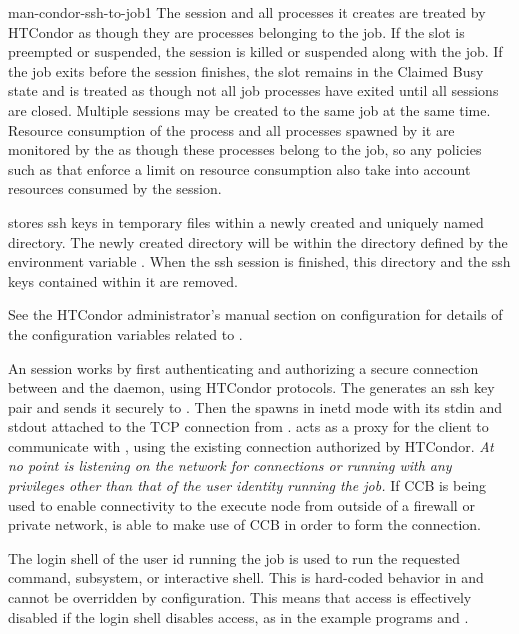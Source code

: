 \begin{ManPage}{}{man-condor-ssh-to-job}{1}
The  session and all processes it creates are treated by HTCondor as
though they are processes belonging to the job.
If the slot is preempted or suspended,
the  session is killed or suspended along with the job.
If the job exits before the  session finishes,
the slot remains in the Claimed Busy state and is treated as though not
all job processes have exited until all  sessions are closed.
Multiple  sessions may be created to the same job at the
same time.  Resource consumption of the  process and all processes
spawned by it are monitored by the  as though these
processes belong to the job, so any policies such as  that
enforce a limit on resource consumption also take into account resources
consumed by the  session.

 stores ssh keys in temporary files within a newly
created and uniquely named directory.
The newly created directory will be within the directory defined
by the environment variable . 
When the ssh session is finished, this directory and the ssh keys
contained within it are removed.

See the HTCondor administrator's manual section on configuration 
for details of the configuration variables related to .

An  session works by first authenticating and authorizing
a secure connection between  and the 
daemon, using HTCondor protocols.
The  generates an ssh key
pair and sends it securely to .
Then the  spawns  in inetd mode with its
stdin and stdout attached to the TCP connection from .
 acts as a proxy
for the  client to communicate with ,
using the existing connection authorized by HTCondor.
\emph{At no point is 
listening on the network for connections or running with any privileges
other than that of the user identity running the job.}
If CCB is being used to enable connectivity to the execute node from
outside of a firewall or private network,  is
able to make use of CCB in order to form the  connection.

The login shell of the user id running the job is used to run the
requested command,  subsystem, or interactive shell.  This
is hard-coded behavior in  and cannot be overridden by
configuration.  This means that  access is
effectively disabled if the login shell disables access,
as in the example programs
 and .


\end{ManPage}
